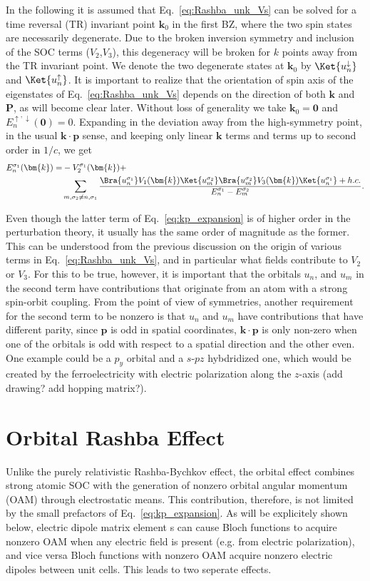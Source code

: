 In the following it is assumed that Eq.~\ref{eq:Rashba_unk_Vs} can be solved for a time reversal (TR) invariant point $\bm{k}_0$ in the first BZ, where the two spin states are necessarily degenerate. Due to the broken inversion symmetry and inclusion of the SOC terms ($V_2$,$V_3$), this degeneracy will be broken for $k$ points away from the TR invariant point.
We denote the two degenerate states at $\bm{k}_0$ by $\Ket{u_n^\downarrow}$ and $\Ket{u_n^\uparrow}$. It is important to realize that the orientation of spin axis of the eigenstates of Eq.~\ref{eq:Rashba_unk_Vs} depends on the direction of both $\bm{k}$ and $\bm{P}$, as will become clear later.
Without loss of generality we take $\bm{k}_0 = \bm{0}$ and $E^{\uparrow,\downarrow}_n(\bm{0}) = 0$.
Expanding in the deviation away from the high-symmetry point, in the usual $\bm{k}\cdot\bm{p}$ sense, and keeping only linear $\bm{k}$ terms and terms up to second order in $1/c$, we get
\begin{align}
	\label{eq:kp_expansion}
	E_n^{\sigma_1}(\bm{k}) =& - V_2^{\sigma_1}(\bm{k}) + \\
		& \sum_{m,\sigma_2 \neq n,\sigma_1}\frac{\Bra{u_n^{\sigma_1}} V_1(\bm{k}) \Ket{u_m^{\sigma_2}}\Bra{u_m^{\sigma_2}} V_3(\bm{k}) \Ket{u_n^{\sigma_1}} + h.c.}{E_n^{\sigma_1} - E_m^{\sigma_2}}.
\end{align}

Even though the latter term of Eq.~\ref{eq:kp_expansion} is of higher order in the perturbation theory, it usually has the same order of magnitude as the former. This can be understood from the previous discussion on the origin of various terms in Eq.~\ref{eq:Rashba_unk_Vs}, and in particular what fields contribute to $V_2$ or $V_3$. 
For this to be true, however, it is important that the orbitals $u_n$, and $u_m$ in the second term have contributions that originate from an atom with a strong spin-orbit coupling. From the point of view of symmetries, another requirement for the second term to be nonzero is that $u_n$ and $u_m$ have contributions that have different parity, since $\bm{p}$ is odd in spatial coordinates, $\bm{k} \cdot \bm{p}$ is only non-zero when one of the orbitals is odd with respect to a spatial direction and the other even. One example could be a $p_y$ orbital and a $s$-$pz$ hybdridized one, which would be created by the ferroelectricity with electric polarization along the $z$-axis (add drawing? add hopping matrix?).

\section{Orbital Rashba Effect}
Unlike the purely relativistic Rashba-Bychkov effect, the orbital effect combines strong atomic SOC with the generation of nonzero orbital angular momentum (OAM) through electrostatic means.
This contribution, therefore, is not limited by the small prefactors of Eq.~\ref{eq:kp_expansion}. As will be explicitely shown below, electric dipole matrix element s can cause Bloch functions to acquire nonzero OAM when any electric field is present (e.g. from electric polarization), and vice versa Bloch functions with nonzero OAM  acquire nonzero electric dipoles between unit cells\cite{Petersen2000,Park2011,Go2016}. This leads to two seperate effects.


